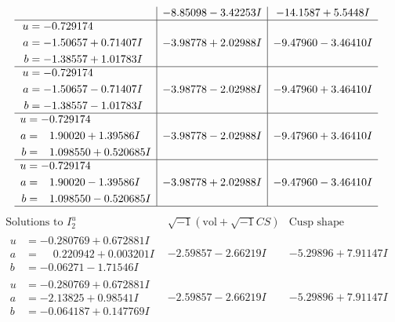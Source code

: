 \documentclass[1p]{elsarticle_modified}
\theoremstyle{definition}
\newcommand{\I}{\sqrt{-1}}
\begin{document}
$$\begin{array}{c|c|c}
 & -8.85098 - 3.42253 I & -14.1587 + 5.5448 I \\ \hline\begin{aligned}
u &= -0.729174\phantom{ +0.000000I} \\
a &= -1.50657 + 0.71407 I \\
b &= -1.38557 + 1.01783 I\end{aligned}
 & -3.98778 + 2.02988 I & -9.47960 - 3.46410 I \\ \hline\begin{aligned}
u &= -0.729174\phantom{ +0.000000I} \\
a &= -1.50657 - 0.71407 I \\
b &= -1.38557 - 1.01783 I\end{aligned}
 & -3.98778 - 2.02988 I & -9.47960 + 3.46410 I \\ \hline\begin{aligned}
u &= -0.729174\phantom{ +0.000000I} \\
a &= \phantom{-}1.90020 + 1.39586 I \\
b &= \phantom{-}1.098550 + 0.520685 I\end{aligned}
 & -3.98778 - 2.02988 I & -9.47960 + 3.46410 I \\ \hline\begin{aligned}
u &= -0.729174\phantom{ +0.000000I} \\
a &= \phantom{-}1.90020 - 1.39586 I \\
b &= \phantom{-}1.098550 - 0.520685 I\end{aligned}
 & -3.98778 + 2.02988 I & -9.47960 - 3.46410 I\\
 \hline 
 \end{array}$$\newpage$$\begin{array}{c|c|c}  
\text{Solutions to }I^u_{2}& \I (\text{vol} + \sqrt{-1}CS) & \text{Cusp shape}\\
 \hline 
\begin{aligned}
u &= -0.280769 + 0.672881 I \\
a &= \phantom{-}0.220942 + 0.003201 I \\
b &= -0.06271 - 1.71546 I\end{aligned}
 & -2.59857 - 2.66219 I & -5.29896 + 7.91147 I \\ \hline\begin{aligned}
u &= -0.280769 + 0.672881 I \\
a &= -2.13825 + 0.98541 I \\
b &= -0.064187 + 0.147769 I\end{aligned}
 & -2.59857 - 2.66219 I & -5.29896 + 7.91147 I \\ \hline\begin{aligned}

\end{aligned}
\end{array}$$
\end{document}
